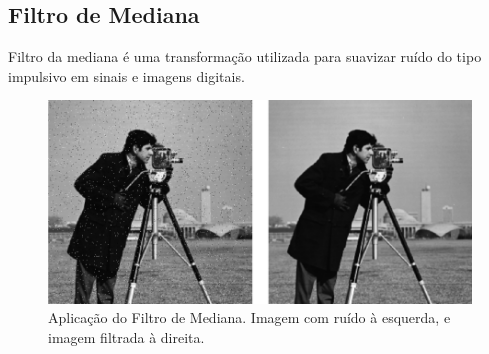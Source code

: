 \subsection{Filtro de Mediana}
\label{sec:median_filter}

Filtro da mediana é uma transformação utilizada para suavizar ruído do tipo impulsivo em sinais e imagens digitais.

\begin{figure}[H]
    \centering
    \caption{Aplicação do Filtro de Mediana. Imagem com ruído à esquerda, e imagem filtrada à direita.}
    \includegraphics[scale=0.45]{dados/figuras/image_median_filter.png}    
\end{figure}

\fi